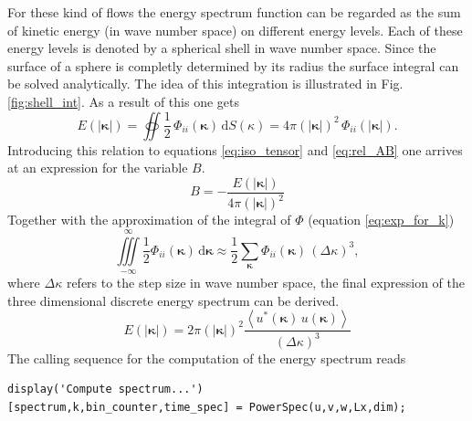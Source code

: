 \documentclass[preprint,12pt,ntfdMod]{elsarticle}
\begin{document}
\begin{par}
For these kind of flows the energy spectrum function can be regarded as the sum of kinetic energy
(in wave number space) on different energy levels. Each of these energy levels is denoted by a spherical
shell in wave number space. Since the surface of a sphere is completly determined by its radius the
surface integral can be solved analytically. The idea of this integration is illustrated
in Fig. \ref{fig:shell_int}.
As a result of this one gets
  \begin{equation}
      E(|\boldsymbol\kappa|)=\oiint\frac{1}{2}\,\Phi_{ii}(\boldsymbol\kappa)\,\mathrm{d}S(\kappa)
      =4\pi(|\boldsymbol\kappa|)^2\,\Phi_{ii}(|\boldsymbol\kappa|).
  \end{equation}
Introducing this relation to equations \eqref{eq:iso_tensor} and
\eqref{eq:rel_AB} one arrives at an expression for the variable $B$.
  \begin{equation}
      B=-\frac{E(|\boldsymbol\kappa|)}{4\pi(|\boldsymbol\kappa|)^2}
  \end{equation}
Together with the approximation of the integral of $\Phi$
(equation \eqref{eq:exp_for_k})
  \begin{equation}
      \iiint\limits_{-\infty}^{\infty}\frac{1}{2}\Phi_{ii}(\boldsymbol\kappa)\,\mathrm{d}\boldsymbol\kappa
      \approx\frac{1}{2}\sum\limits_{\boldsymbol\kappa}\Phi_{ii}(\boldsymbol\kappa)\,(\Delta\kappa)^3,
  \end{equation}
where $\Delta\kappa$ refers to the step size in wave number space,
the final expression of the three dimensional discrete energy spectrum can be derived.
  \begin{equation}
      E(|\boldsymbol\kappa|)=2\pi(|\boldsymbol\kappa|)^2\frac{\left<u^{*}
      (\boldsymbol\kappa)\,u(\boldsymbol\kappa)\right>}{(\Delta\kappa)^3}
  \end{equation}
The calling sequence for the computation of the energy spectrum reads

\end{par} \vspace{1em}
\begin{lstlisting}
display('Compute spectrum...')
[spectrum,k,bin_counter,time_spec] = PowerSpec(u,v,w,Lx,dim);
\end{lstlisting}
\begin{par}



\end{par} \vspace{1em}
\end{document}
